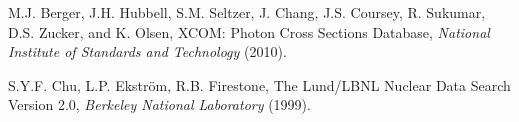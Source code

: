 \begin{thebibliography}{99}

M.J. Berger, J.H. Hubbell, S.M. Seltzer, J. Chang, J.S. Coursey, R. Sukumar, D.S. Zucker, and K. Olsen, XCOM: Photon Cross Sections Database, \emph{National Institute of Standards and Technology} (2010).

S.Y.F. Chu, L.P. Ekström, R.B. Firestone, The Lund/LBNL Nuclear Data Search Version 2.0, \emph{Berkeley National Laboratory} (1999).

\end{thebibliography}